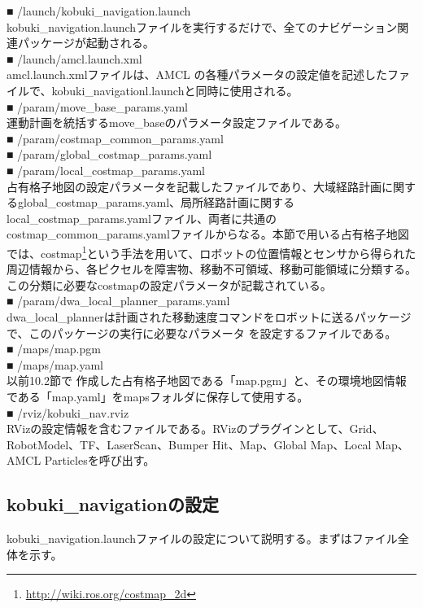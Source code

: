 ■ /launch/kobuki\_navigation.launch\\
kobuki\_navigation.launchファイルを実行するだけで、全てのナビゲーション関連パッケージが起動される。\\
■ /launch/amcl.launch.xml\\
amcl.launch.xmlファイルは、AMCL の各種パラメータの設定値を記述したファイルで、kobuki\_navigationl.launchと同時に使用される。\\
■ /param/move\_base\_params.yaml\\
運動計画を統括するmove\_baseのパラメータ設定ファイルである。\\
■ /param/costmap\_common\_params.yaml\\
■ /param/global\_costmap\_params.yaml\\
■ /param/local\_costmap\_params.yaml\\
占有格子地図の設定パラメータを記載したファイルであり、大域経路計画に関するglobal\_costmap\_params.yaml、局所経路計画に関するlocal\_costmap\_params.yamlファイル、両者に共通のcostmap\_common\_params.yamlファイルからなる。本節で用いる占有格子地図では、costmap\footnote{\url{http://wiki.ros.org/costmap\_2d}}という手法を用いて、ロボットの位置情報とセンサから得られた周辺情報から、各ピクセルを障害物、移動不可領域、移動可能領域に分類する。この分類に必要なcostmapの設定パラメータが記載されている。\\
■ /param/dwa\_local\_planner\_params.yaml\\
dwa\_local\_plannerは計画された移動速度コマンドをロボットに送るパッケージで、このパッケージの実行に必要なパラメータ  を設定するファイルである。\\
■ /maps/map.pgm\\
■ /maps/map.yaml\\
以前10.2節で  作成した占有格子地図である「map.pgm」と、その環境地図情報である「map.yaml」をmapsフォルダに保存して使用する。\\
■ /rviz/kobuki\_nav.rviz\\
RVizの設定情報を含むファイルである。RVizのプラグインとして、Grid、RobotModel、TF、LaserScan、Bumper Hit、Map、Global Map、Local Map、AMCL Particlesを呼び出す。

\subsection{kobuki\_navigationの設定}

kobuki\_navigation.launchファイルの設定について説明する。まずはファイル全体を示す。


